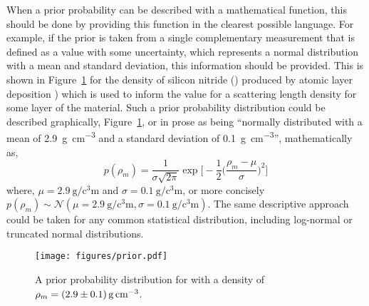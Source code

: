 \documentclass[reprint,superscriptaddress,aps,amsmath,linenumbers]{revtex4-2}
\begin{document}
When a prior probability can be described with a mathematical function, this should be done by providing this function in the clearest possible language. 
For example, if the prior is taken from a single complementary measurement that is defined as a value with some uncertainty, which represents a normal distribution with a mean and standard deviation, this information should be provided. 
This is shown in Figure~\ref{fig:prior} for the density of silicon nitride () produced by atomic layer deposition \cite{knoops_atomic_2015}) which is used to inform the value for a scattering length density for some layer of the material.
Such a prior probability distribution could be described graphically, Figure~\ref{fig:prior}, or in prose as being ``normally distributed with a mean of \SI{2.9}{\gram\per\cubic\centi\meter} and a standard deviation of \SI{0.1}{\gram\per\cubic\centi\meter}'', mathematically as, 
%
\begin{equation}
  p(\rho_m) = \frac{1}{\sigma\sqrt{2\pi}}\exp\Bigg[-\frac{1}{2}\bigg(\frac{\rho_m-\mu}{\sigma}\bigg)^2\Bigg]
\end{equation}
%
where, $\mu=\SI{2.9}{\gram\per\cubic\centi\meter}$ and $\sigma=\SI{0.1}{\gram\per\cubic\centi\meter}$, or more concisely $p(\rho_m) \sim \mathcal{N}(\mu=\SI{2.9}{\gram\per\cubic\centi\meter}, \sigma=\SI{0.1}{\gram\per\cubic\centi\meter})$. 
The same descriptive approach could be taken for any common statistical distribution, including log-normal or truncated normal distributions. 
%
\begin{figure}
  \texttt{[image: figures/prior.pdf]}
  \caption{
    A prior probability distribution for  with a density of $\rho_m=\SI{2.9\pm0.1}{\gram\per\cubic\centi\meter}$. 
  }
  \label{fig:prior}
\end{figure}
%
\end{document}
